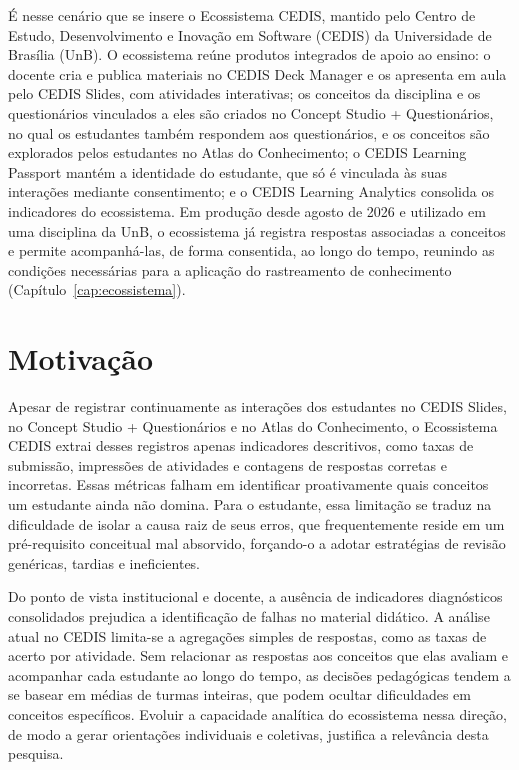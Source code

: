É nesse cenário que se insere o Ecossistema CEDIS, mantido pelo Centro de Estudo, Desenvolvimento e Inovação em Software (CEDIS) da Universidade de Brasília (UnB). O ecossistema reúne produtos integrados de apoio ao ensino: o docente cria e publica materiais no CEDIS Deck Manager e os apresenta em aula pelo CEDIS Slides, com atividades interativas; os conceitos da disciplina e os questionários vinculados a eles são criados no Concept Studio + Questionários, no qual os estudantes também respondem aos questionários, e os conceitos são explorados pelos estudantes no Atlas do Conhecimento; o CEDIS Learning Passport mantém a identidade do estudante, que só é vinculada às suas interações mediante consentimento; e o CEDIS Learning Analytics consolida os indicadores do ecossistema. Em produção desde agosto de 2026 e utilizado em uma disciplina da UnB, o ecossistema já registra respostas associadas a conceitos e permite acompanhá-las, de forma consentida, ao longo do tempo, reunindo as condições necessárias para a aplicação do rastreamento de conhecimento (Capítulo~\ref{cap:ecossistema}).

\section{Motivação}

Apesar de registrar continuamente as interações dos estudantes no CEDIS Slides, no Concept Studio + Questionários e no Atlas do Conhecimento, o Ecossistema CEDIS extrai desses registros apenas indicadores descritivos, como taxas de submissão, impressões de atividades e contagens de respostas corretas e incorretas. Essas métricas falham em identificar proativamente quais conceitos um estudante ainda não domina. Para o estudante, essa limitação se traduz na dificuldade de isolar a causa raiz de seus erros, que frequentemente reside em um pré-requisito conceitual mal absorvido, forçando-o a adotar estratégias de revisão genéricas, tardias e ineficientes.

Do ponto de vista institucional e docente, a ausência de indicadores diagnósticos consolidados prejudica a identificação de falhas no material didático. A análise atual no CEDIS limita-se a agregações simples de respostas, como as taxas de acerto por atividade. Sem relacionar as respostas aos conceitos que elas avaliam e acompanhar cada estudante ao longo do tempo, as decisões pedagógicas tendem a se basear em médias de turmas inteiras, que podem ocultar dificuldades em conceitos específicos. Evoluir a capacidade analítica do ecossistema nessa direção, de modo a gerar orientações individuais e coletivas, justifica a relevância desta pesquisa.


